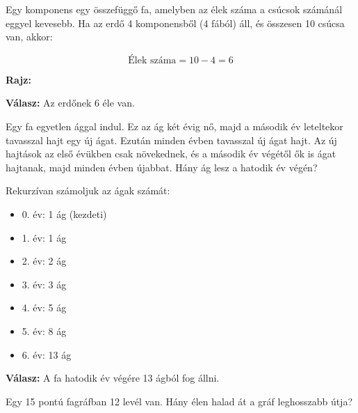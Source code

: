 \begin{solution}
Egy komponens egy összefüggő fa, amelyben az élek száma a csúcsok
számánál eggyel kevesebb. Ha az erdő 4 komponensből (4 fából) áll,
és összesen 10 csúcsa van, akkor:

\[
\text{Élek száma}=10-4=6
\]

\textbf{Rajz:}


\noindent\textbf{Válasz:} Az erdőnek 6 éle van.
\end{solution}
\begin{problem}
Egy fa egyetlen ággal indul. Ez az ág két évig nő, majd a második
év leteltekor tavasszal hajt egy új ágat. Ezután minden évben tavasszal
új ágat hajt. Az új hajtások az első évükben csak növekednek, és a
második év végétől ők is ágat hajtanak, majd minden évben újabbat.
Hány ág lesz a hatodik év végén?
\end{problem}

\begin{solution}
Rekurzívan számoljuk az ágak számát:
\begin{itemize}
\item 0. év: 1 ág (kezdeti) 
\item 1. év: 1 ág 
\item 2. év: 2 ág 
\item 3. év: 3 ág 
\item 4. év: 5 ág 
\item 5. év: 8 ág 
\item 6. év: 13 ág 
\end{itemize}
\noindent\textbf{Válasz:} A fa hatodik év végére 13 ágból fog állni.

\end{solution}
\begin{problem}
Egy 15 pontú fagráfban 12 levél van. Hány élen halad át a gráf leghosszabb
útja? 
\end{problem}

